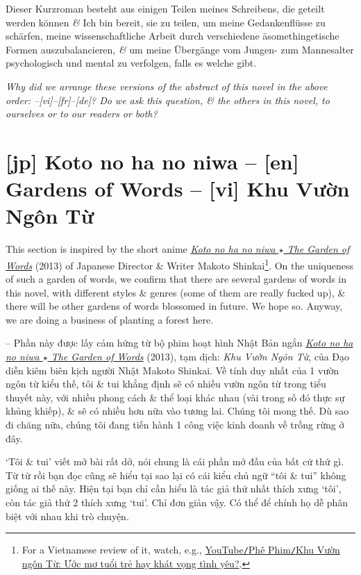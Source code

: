 \documentclass[12pt,twoside]{book}
\begin{document}
\noindent{\sf[de]} Dieser Kurzroman besteht aus einigen Teilen meines Schreibens, die geteilt werden können {\it\&} Ich bin bereit, sie zu teilen, um meine Gedankenflüsse zu schärfen, meine wissenschaftliche Arbeit durch verschiedene äsomethingetische Formen auszubalancieren, {\it\&} um meine Übergänge vom Jungen- zum Mannesalter psychologisch und mental zu verfolgen, falls es welche gibt.
\vspace{5mm}

{\it Why did we arrange these versions of the abstract of this novel in the above order: {\sf[en]--[vi]--[fr]--[de]}? Do we ask this question, \& the others in this novel, to ourselves or to our readers or both?}


\section*{[jp] Koto no ha no niwa -- [en] Gardens of Words -- [vi] Khu Vườn Ngôn Từ}
This section is inspired by the short anime \href{https://www.imdb.com/title/tt2591814/}{\it Koto no ha no niwa $\star$ The Garden of Words} (2013) of Japanese Director \& Writer {\sc Makoto Shinkai}\footnote{For a Vietnamese review of it, watch, e.g., \href{https://www.youtube.com/watch?v=A0dzGAjC4So}{YouTube{\tt/}Phê Phim{\tt/}Khu Vườn ngôn Từ: Ước mơ tuổi trẻ hay khát vọng tình yêu?}.}. On the uniqueness of such a garden of words, we confirm that there are several gardens of words in this novel, with different styles \& genres (some of them are really fucked up), \& there will be other gardens of words blossomed in future. We hope so. Anyway, we are doing a business of planting a forest here.

-- Phần này được lấy cảm hứng từ bộ phim hoạt hình Nhật Bản ngắn \href{https://www.imdb.com/title/tt2591814/}{\it Koto no ha no niwa $\star$ The Garden of Words} (2013), tạm dịch: {\it Khu Vườn Ngôn Từ}, của Đạo diễn kiêm biên kịch người Nhật {\sc Makoto Shinkai}. Về tính duy nhất của 1 vườn ngôn từ kiểu thế, tôi \& tui khẳng định sẽ có nhiều vườn ngôn từ trong tiểu thuyết này, với nhiều phong cách \& thể loại khác nhau (vài trong số đó thực sự khủng khiếp), \& sẽ có nhiều hơn nữa vào tương lai. Chúng tôi mong thế. Dù sao đi chăng nữa, chúng tôi đang tiến hành 1 công việc kinh doanh về trồng rừng ở đây.

`Tôi \& tui' viết mở bài rất dở, nói chung là cái phần mở đầu của bất cứ thứ gì. Từ từ rồi bạn đọc cũng sẽ hiểu tại sao lại có cái kiểu chủ ngữ ``tôi \& tui'' không giống ai thế này. Hiện tại bạn chỉ cần hiểu là tác giả thứ nhất thích xưng `tôi', còn tác giả thứ 2 thích xưng `tui'. Chỉ đơn giản vậy. Có thể để chính họ dễ phân biệt với nhau khi trò chuyện.
\end{document}

